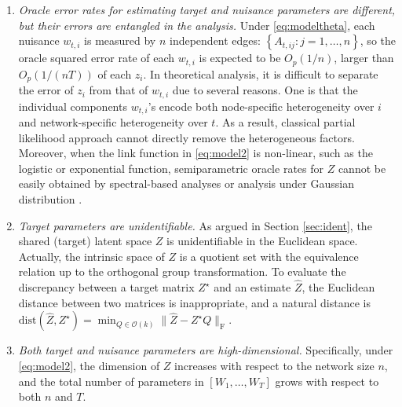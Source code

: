 \documentclass[12pt]{article}
\begin{document}
\begin{enumerate}[leftmargin=17pt]
\setlength{\itemsep}{0pt}
    \item \textit{Oracle error rates for estimating target  and nuisance parameters are different, but their errors are entangled in the analysis.} Under \eqref{eq:modeltheta}, each nuisance $w_{t,i}$ is measured by $n$ independent edges: $\left\{A_{t, i j}: j=1, \ldots, n\right\}$, so   
 the oracle squared error rate of each $w_{t,i}$ is expected to be $O_p(1/n)$, larger than $O_p(1/(nT))$ of each $z_i$. 
In theoretical analysis,
it is difficult to separate the error of $z_i$ from that of $w_{t,i}$ due to several reasons. 
One is that the individual components $w_{t,i}$'s 
encode both node-specific heterogeneity over $i$ and  network-specific heterogeneity over $t$. 
As a result, classical partial likelihood approach \citep{andersen1982cox} cannot directly remove the  heterogeneous factors.  
Moreover, when the link function in \eqref{eq:model2} is non-linear, such as the logistic or exponential function, 
semiparametric oracle rates for $Z$ cannot be easily obtained by  
spectral-based analyses \citep{arroyo2021inference} or analysis under Gaussian distribution \citep{macdonald2022latent}. 
\item \textit{Target parameters are  unidentifiable.} 
As  argued in Section  \ref{sec:ident}, the shared (target) latent space $Z$ is unidentifiable in the Euclidean space. 
Actually, the intrinsic space of  $Z$ is a quotient set with the equivalence relation up  to the orthogonal group transformation. To evaluate the discrepancy between a target  matrix $Z^{\star}$ and an estimate $\hat{Z}$, the Euclidean distance between two matrices is inappropriate, and a natural distance is $\mathrm{dist}(\hat{Z}, Z^{\star}) = \min_{Q\in \mathcal{O}(k) }\|\hat{Z}-Z^{\star}Q\|_{\mathrm{F}}$. 
\item \textit{Both target and nuisance parameters are high-dimensional.} Specifically, under \eqref{eq:model2}, the dimension of $Z$ increases with respect to the network size $n$, and the total number of parameters in $[W_1,\ldots, W_T]$ grows with  respect to both $n$ and $T$. 
\end{enumerate}
\end{document}

